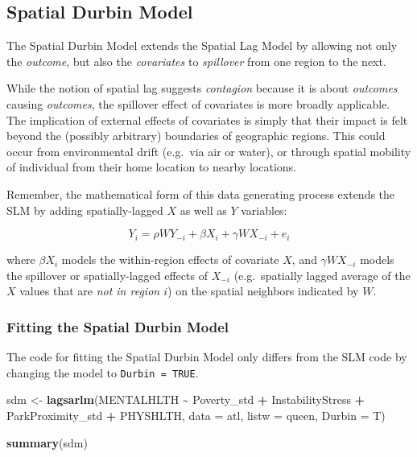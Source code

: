 \documentclass[
]{book}
\newenvironment{Shaded}{\begin{snugshade}}{\end{snugshade}}
\newcommand{\AttributeTok}[1]{\textcolor[rgb]{0.13,0.29,0.53}{#1}}
\newcommand{\FunctionTok}[1]{\textcolor[rgb]{0.13,0.29,0.53}{\textbf{#1}}}
\newcommand{\NormalTok}[1]{#1}
\newcommand{\OtherTok}[1]{\textcolor[rgb]{0.56,0.35,0.01}{#1}}
\newcommand{\SpecialCharTok}[1]{\textcolor[rgb]{0.81,0.36,0.00}{\textbf{#1}}}
\begin{document}
\hypertarget{spatial-durbin-model-1}{%
\subsection{Spatial Durbin Model}\label{spatial-durbin-model-1}}

The Spatial Durbin Model extends the Spatial Lag Model by allowing not only the \emph{outcome}, but also the \emph{covariates} to \emph{spillover} from one region to the next.

While the notion of spatial lag suggests \emph{contagion} because it is about \emph{outcomes} causing \emph{outcomes}, the spillover effect of covariates is more broadly applicable. The implication of external effects of covariates is simply that their impact is felt beyond the (possibly arbitrary) boundaries of geographic regions. This could occur from environmental drift (e.g.~via air or water), or through spatial mobility of individual from their home location to nearby locations.

Remember, the mathematical form of this data generating process extends the SLM by adding spatially-lagged \(X\) as well as \(Y\) variables:

\[Y_i=\rho WY_{-i}+\beta X_i + \gamma WX_{-i} + e_i\]

where \(\beta X_i\) models the within-region effects of covariate \(X\), and \(\gamma WX_{-i}\) models the spillover or spatially-lagged effects of \(X_{-i}\) (e.g.~spatially lagged average of the \(X\) values that are \emph{not in region \(i\)}) on the spatial neighbors indicated by \(W\).

\hypertarget{fitting-the-spatial-durbin-model}{%
\subsubsection{Fitting the Spatial Durbin Model}\label{fitting-the-spatial-durbin-model}}

The code for fitting the Spatial Durbin Model only differs from the SLM code by changing the model to \texttt{Durbin\ =\ TRUE}.

\begin{Shaded}
\begin{Highlighting}[]
\NormalTok{sdm }\OtherTok{\textless{}{-}} \FunctionTok{lagsarlm}\NormalTok{(MENTALHLTH }\SpecialCharTok{\textasciitilde{}}\NormalTok{ Poverty\_std }\SpecialCharTok{+}\NormalTok{ InstabilityStress }\SpecialCharTok{+}\NormalTok{ ParkProximity\_std  }\SpecialCharTok{+}\NormalTok{ PHYSHLTH,}
                \AttributeTok{data =}\NormalTok{ atl,}
                \AttributeTok{listw =}\NormalTok{ queen,}
                \AttributeTok{Durbin =}\NormalTok{ T)}

\FunctionTok{summary}\NormalTok{(sdm)}
\end{Highlighting}
\end{Shaded}
\end{document}
